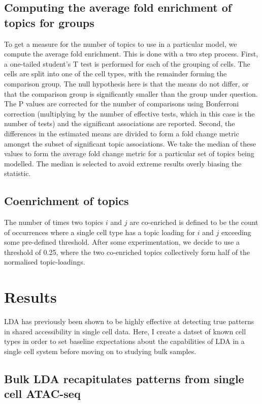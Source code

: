 \subsection{Computing the average fold enrichment of topics for groups} \label{methods:average_fc}

To get a measure for the number of topics to use in a particular model, we compute the average fold enrichment. This is done with a two step process. First, a one-tailed student's T test is performed for each of the grouping of cells. The cells are split into one of the cell types, with the remainder forming the comparison group. The null hypothesis here is that the means do not differ, or that the comparison group is significantly smaller than the group under question. The P values are corrected for the number of comparisons using Bonferroni correction (multiplying by the number of effective tests, which in this case is the number of tests) and the significant associations are reported. Second, the differences in the estimated means are divided to form a fold change metric amongst the subset of significant topic associations. We take the median of these values to form the average fold change metric for a particular set of topics being modelled. The median is selected to avoid extreme results overly biasing the statistic.

\subsection{Coenrichment of topics}

The number of times two topics $i$ and $j$ are co-enriched is defined to be the count of occurrences where a single cell type has a topic loading for $i$ and $j$ exceeding some pre-defined threshold. After some experimentation, we decide to use a threshold of 0.25, where the two co-enriched topics collectively form half of the normalised topic-loadings. 

\section{Results} \label{ch4:results}

LDA has previously been shown to be highly effective at detecting true patterns in shared accessibility in single cell data. Here, I create a datset of known cell types in order to set baseline expectations about the capabilities of LDA in a single cell system before moving on to studying bulk samples.

\subsection{Bulk LDA recapitulates patterns from single cell ATAC-seq}

